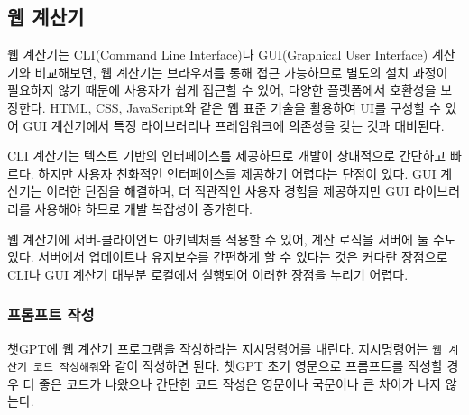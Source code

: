 \documentclass[
  letterpaper,
]{book}
\begin{document}
\hypertarget{uxc6f9-uxacc4uxc0b0uxae30}{%
\subsection{웹 계산기}\label{uxc6f9-uxacc4uxc0b0uxae30}}

웹 계산기는 CLI(Command Line Interface)나 GUI(Graphical User Interface)
계산기와 비교해보면, 웹 계산기는 브라우저를 통해 접근 가능하므로 별도의
설치 과정이 필요하지 않기 때문에 사용자가 쉽게 접근할 수 있어, 다양한
플랫폼에서 호환성을 보장한다. HTML, CSS, JavaScript와 같은 웹 표준
기술을 활용하여 UI를 구성할 수 있어 GUI 계산기에서 특정 라이브러리나
프레임워크에 의존성을 갖는 것과 대비된다.

CLI 계산기는 텍스트 기반의 인터페이스를 제공하므로 개발이 상대적으로
간단하고 빠르다. 하지만 사용자 친화적인 인터페이스를 제공하기 어렵다는
단점이 있다. GUI 계산기는 이러한 단점을 해결하며, 더 직관적인 사용자
경험을 제공하지만 GUI 라이브러리를 사용해야 하므로 개발 복잡성이
증가한다.

웹 계산기에 서버-클라이언트 아키텍처를 적용할 수 있어, 계산 로직을
서버에 둘 수도 있다. 서버에서 업데이트나 유지보수를 간편하게 할 수
있다는 것은 커다란 장점으로 CLI나 GUI 계산기 대부분 로컬에서 실행되어
이러한 장점을 누리기 어렵다.

\hypertarget{uxd504uxb86cuxd504uxd2b8-uxc791uxc131-2}{%
\subsubsection{프롬프트
작성}\label{uxd504uxb86cuxd504uxd2b8-uxc791uxc131-2}}

챗GPT에 웹 계산기 프로그램을 작성하라는 지시명령어를 내린다.
지시명령어는 \texttt{웹\ 계산기\ 코드\ 작성해줘}와 같이 작성하면 된다.
챗GPT 초기 영문으로 프롬프트를 작성할 경우 더 좋은 코드가 나왔으나
간단한 코드 작성은 영문이나 국문이나 큰 차이가 나지 않는다.
\end{document}
